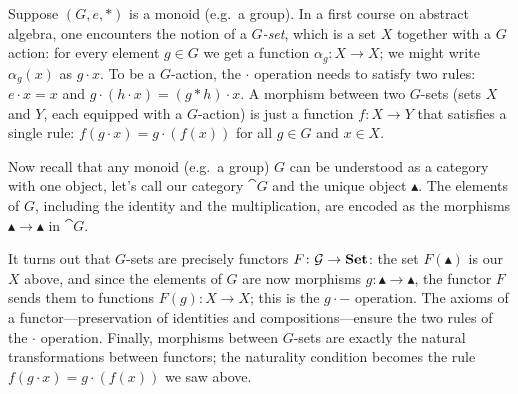 \documentclass[DynamicalBook]{subfiles}
\begin{document}
\begin{example}
Suppose $(G,e,*)$ is a monoid (e.g.\ a group). In a first course on abstract algebra, one encounters the notion of a \emph{$G$-set}, which is a set $X$ together with a $G$ action: for every element $g\in G$ we get a function $\alpha_g\colon X\to X$; we might write $\alpha_g(x)$ as $g\cdot x$. To be a $G$-action, the $\cdot$ operation needs to satisfy two rules: $e\cdot x=x$ and $g\cdot(h\cdot x)=(g*h)\cdot x$. A morphism between two $G$-sets (sets $X$ and $Y$, each equipped with a $G$-action) is just a function $f\colon X\to Y$ that  satisfies a single rule: $f(g\cdot x)=g\cdot (f(x))$ for all $g\in G$ and $x\in X$.

Now recall that any monoid (e.g.\ a group) $G$ can be understood as a category with one object, let's call our category $\cat{G}$ and the unique object $\blacktriangle$. The elements of $G$, including the identity and the multiplication, are encoded as the morphisms $\blacktriangle\to\blacktriangle$ in $\cat{G}$. 

It turns out that $G$-sets are precisely functors $F\colon\mathcal{G}\to\textbf{Set}$: the set $F(\blacktriangle)$ is our $X$ above, and since the elements of $G$ are now morphisms $g\colon \blacktriangle\to\blacktriangle$, the functor $F$ sends them to functions $F(g)\colon X\to X$; this is the $g\cdot-$ operation. The axioms of a functor---preservation of identities and compositions---ensure the two rules of the $\cdot$ operation. Finally, morphisms between $G$-sets are exactly the natural transformations between functors; the naturality condition becomes the rule $f(g\cdot x)=g\cdot (f(x))$ we saw above.

\end{example}
\end{document}
